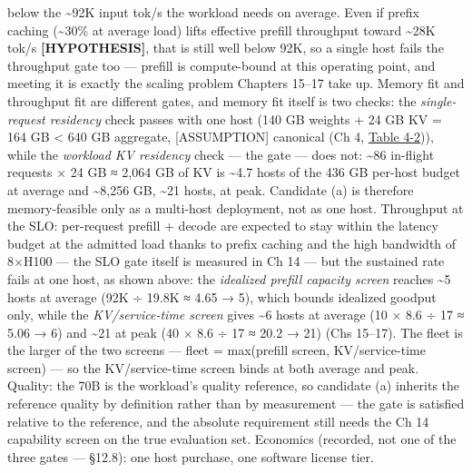 below the \textasciitilde92K input tok/s the workload needs on average.
Even if prefix caching (\textasciitilde30\% at average load) lifts
effective prefill throughput toward \textasciitilde28K tok/s
\textbf{\mbox{{[}HYPOTHESIS{]}}}, that is still well below 92K, so a single
host fails the throughput gate too --- prefill is compute-bound at this
operating point, and meeting it is exactly the scaling problem Chapters
15--17 take up. Memory fit and throughput fit are different gates, and
memory fit itself is two checks: the \emph{single-request residency}
check passes with one host (140 GB weights + 24 GB KV = 164 GB
\textless{} 640 GB aggregate, \mbox{{[}ASSUMPTION{]}} canonical (Ch 4, \hyperref[tab:4.2]{Table 4-2})), while the \emph{workload KV residency} check --- the gate ---
does not: \textasciitilde86 in-flight requests × 24 GB ≈ 2,064 GB of KV
is \textasciitilde4.7 hosts of the 436 GB per-host budget at average and
\textasciitilde8,256 GB, \textasciitilde21 hosts, at peak. Candidate (a)
is therefore memory-feasible only as a multi-host deployment, not as one
host. Throughput at the SLO: per-request prefill + decode are expected
to stay within the latency budget at the admitted load thanks to prefix
caching and the high bandwidth of 8×H100 --- the SLO gate itself is
measured in Ch 14 --- but the sustained rate fails at one host, as shown
above: the \emph{idealized prefill capacity screen} reaches
\textasciitilde5 hosts at average (92K ÷ 19.8K ≈ 4.65 → 5), which bounds
idealized goodput only, while the \emph{KV/service-time screen} gives
\textasciitilde6 hosts at average (10 × 8.6 ÷ 17 ≈ 5.06 → 6) and
\textasciitilde21 at peak (40 × 8.6 ÷ 17 ≈ 20.2 → 21) (Chs 15--17). The
fleet is the larger of the two screens --- fleet = max(prefill screen,
KV/service-time screen) --- so the KV/service-time screen binds at both
average and peak. Quality: the 70B is the workload's quality reference,
so candidate (a) inherits the reference quality by definition rather
than by measurement --- the gate is satisfied relative to the reference,
and the absolute requirement still needs the Ch 14 capability screen on
the true evaluation set. Economics (recorded, not one of the three gates
--- §12.8): one host purchase, one software license tier.

